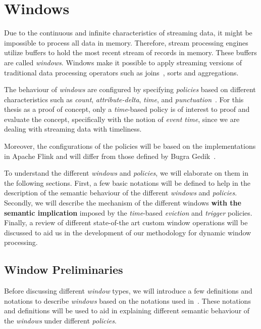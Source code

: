 \chapter{Windows}
\label{chap:windows}

Due to the continuous and infinite characteristics of streaming data, 
it might be impossible to process all data in memory. Therefore, 
stream processing engines utilize buffers to hold the most recent stream of 
records in memory. These buffers are called \emph{windows}. Windows make it 
possible to apply streaming versions of traditional data processing operators such
as joins~\cite{grubjoin}, sorts and aggregations. 

The behaviour of \emph{windows} are configured by specifying \emph{policies}
based on different characteristics such as \emph{count}, \emph{attribute-delta}, \emph{time}, and
\emph{punctuation}~\cite{generic_window_sem}. For this thesis as a 
proof of concept, only a
\emph{time}-based policy is of interest to proof and evaluate the 
concept, specifically with the notion of \emph{event time},
since we are dealing with streaming data with 
timeliness.

Moreover, the configurations of the policies will be based on the 
implementations in Apache Flink and will differ from those defined by 
Bugra Gedik~\cite{generic_window_sem}. 


To understand the different \emph{windows} and \emph{policies}, we will elaborate on them 
in the following sections. First, a few basic notations will be defined to 
help in the description of the semantic behaviour of the different 
\emph{windows} and \emph{policies}. Secondly, we will describe the mechanism of the 
different windows \textbf{with the semantic implication} imposed by the 
\emph{time}-based \emph{eviction} and \emph{trigger} policies. 
Finally, a review of different state-of-the art custom window operations 
will be discussed to aid us in the development of our methodology for 
dynamic window processing. 


\section{Window Preliminaries}%
\label{sec:window_notations}

Before discussing different \emph{window} types, we will introduce a 
few definitions and notations to describe \emph{windows} based 
on the notations used in~\cite{generic_window_sem}. These notations and definitions 
will be used to aid in explaining different semantic behaviour of the \emph{windows} under 
different \emph{policies}. 

